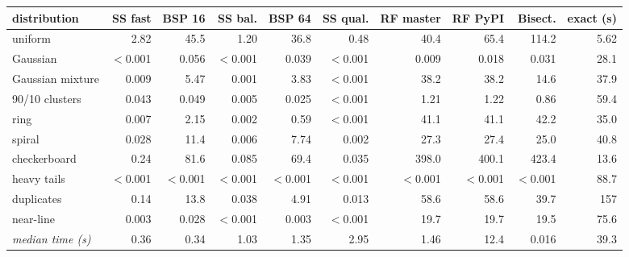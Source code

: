 \begin{tabular}{lrrrrrrrrr}
\toprule
distribution & SS fast & BSP 16 & SS bal. & BSP 64 & SS qual. & RF master & RF PyPI & Bisect. & exact (s) \\
\midrule
uniform & 2.82 & 45.5 & 1.20 & 36.8 & 0.48 & 40.4 & 65.4 & 114.2 & 5.62 \\
Gaussian & $<$0.001 & 0.056 & $<$0.001 & 0.039 & $<$0.001 & 0.009 & 0.018 & 0.031 & 28.1 \\
Gaussian mixture & 0.009 & 5.47 & 0.001 & 3.83 & $<$0.001 & 38.2 & 38.2 & 14.6 & 37.9 \\
90/10 clusters & 0.043 & 0.049 & 0.005 & 0.025 & $<$0.001 & 1.21 & 1.22 & 0.86 & 59.4 \\
ring & 0.007 & 2.15 & 0.002 & 0.59 & $<$0.001 & 41.1 & 41.1 & 42.2 & 35.0 \\
spiral & 0.028 & 11.4 & 0.006 & 7.74 & 0.002 & 27.3 & 27.4 & 25.0 & 40.8 \\
checkerboard & 0.24 & 81.6 & 0.085 & 69.4 & 0.035 & 398.0 & 400.1 & 423.4 & 13.6 \\
heavy tails & $<$0.001 & $<$0.001 & $<$0.001 & $<$0.001 & $<$0.001 & $<$0.001 & $<$0.001 & $<$0.001 & 88.7 \\
duplicates & 0.14 & 13.8 & 0.038 & 4.91 & 0.013 & 58.6 & 58.6 & 39.7 & 157 \\
near-line & 0.003 & 0.028 & $<$0.001 & 0.003 & $<$0.001 & 19.7 & 19.7 & 19.5 & 75.6 \\
\midrule
\emph{median time (s)} & 0.36 & 0.34 & 1.03 & 1.35 & 2.95 & 1.46 & 12.4 & 0.016 & 39.3 \\
\bottomrule
\end{tabular}
